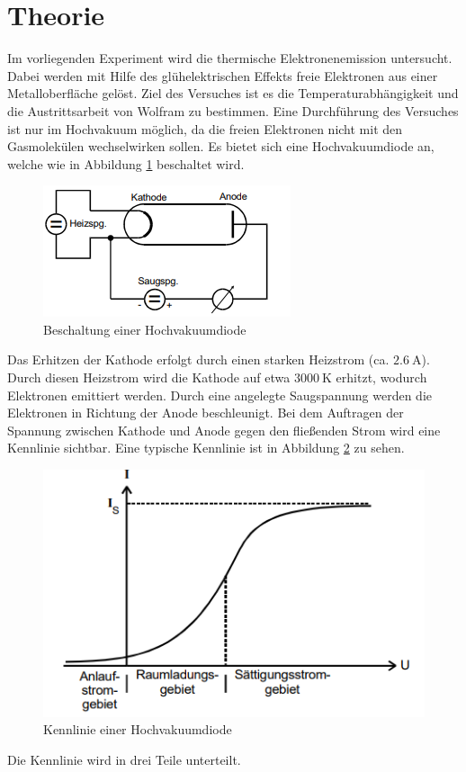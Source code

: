 \section{Theorie}
\label{sec:Theorie}
Im vorliegenden Experiment wird die thermische Elektronenemission untersucht. Dabei werden mit Hilfe des glühelektrischen Effekts freie Elektronen aus einer Metalloberfläche gelöst.
Ziel des Versuches ist es die Temperaturabhängigkeit und die Austrittsarbeit von Wolfram zu bestimmen.
Eine Durchführung des Versuches ist nur im Hochvakuum möglich, da die freien Elektronen nicht mit den Gasmolekülen wechselwirken sollen.
Es bietet sich eine Hochvakuumdiode an, welche wie in Abbildung \ref{fig:diode} beschaltet wird.
\begin{figure}
    \centering
    \caption{Beschaltung einer Hochvakuumdiode \cite{v504}}
    \label{fig:diode}
    \includegraphics[width = 0.5 \textwidth]{pics/Vakuumdiode.png}
\end{figure}
Das Erhitzen der Kathode erfolgt durch einen starken Heizstrom (ca. $\SI{2.6}{\ampere}$). Durch diesen Heizstrom wird die Kathode auf etwa $\SI{3000}{\kelvin}$ erhitzt, wodurch Elektronen emittiert werden.
Durch eine angelegte Saugspannung werden die Elektronen in Richtung der Anode beschleunigt.
Bei dem Auftragen der Spannung zwischen Kathode und Anode gegen den fließenden Strom wird eine Kennlinie sichtbar.
Eine typische Kennlinie ist in Abbildung \ref{fig:kennlinie} zu sehen.
\begin{figure}
    \centering
    \caption{Kennlinie einer Hochvakuumdiode \cite{v504}}
    \label{fig:kennlinie}
    \includegraphics[width = 0.5 \textwidth]{pics/kennlinie.png}
\end{figure}
Die Kennlinie wird in drei Teile unterteilt. 
